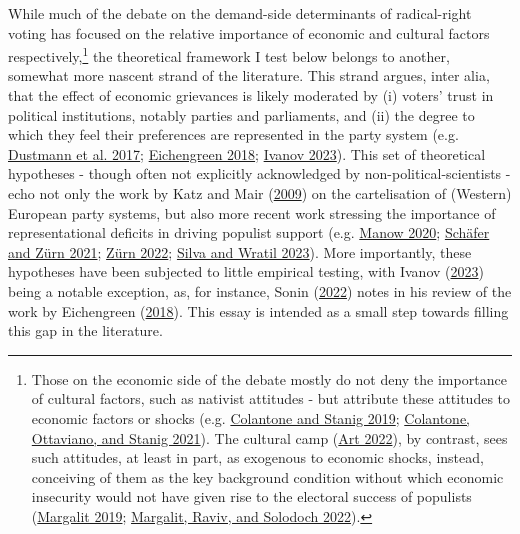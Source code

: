 \documentclass[
]{article}
\begin{document}
While much of the debate on the demand-side determinants of
radical-right voting has focused on the relative importance of economic
and cultural factors respectively,\footnote{Those on the economic side
  of the debate mostly do not deny the importance of cultural factors,
  such as nativist attitudes - but attribute these attitudes to economic
  factors or shocks (e.g.
  \protect\hyperlink{ref-colantone_surge_2019}{Colantone and Stanig
  2019}; \protect\hyperlink{ref-colantone_backlash_2021}{Colantone,
  Ottaviano, and Stanig 2021}). The cultural camp
  (\protect\hyperlink{ref-art_myth_2022}{Art 2022}), by contrast, sees
  such attitudes, at least in part, as exogenous to economic shocks,
  instead, conceiving of them as the key background condition without
  which economic insecurity would not have given rise to the electoral
  success of populists
  (\protect\hyperlink{ref-margalit_economic_2019}{Margalit 2019};
  \protect\hyperlink{ref-margalit_cultural_2022}{Margalit, Raviv, and
  Solodoch 2022}).} the theoretical framework I test below belongs to
another, somewhat more nascent strand of the literature. This strand
argues, inter alia, that the effect of economic grievances is likely
moderated by (i) voters' trust in political institutions, notably
parties and parliaments, and (ii) the degree to which they feel their
preferences are represented in the party system (e.g.
\protect\hyperlink{ref-dustmann_europes_2017}{Dustmann et al. 2017};
\protect\hyperlink{ref-eichengreen_populist_2018}{Eichengreen 2018};
\protect\hyperlink{ref-ivanov_economic_2023}{Ivanov 2023}). This set of
theoretical hypotheses - though often not explicitly acknowledged by
non-political-scientists - echo not only the work by Katz and Mair
(\protect\hyperlink{ref-katz_cartel_2009}{2009}) on the cartelisation of
(Western) European party systems, but also more recent work stressing
the importance of representational deficits in driving populist support
(e.g. \protect\hyperlink{ref-manow_ent-demokratisierung_2020}{Manow
2020}; \protect\hyperlink{ref-schafer_demokratische_2021}{Schäfer and
Zürn 2021}; \protect\hyperlink{ref-zurn_how_2022}{Zürn 2022};
\protect\hyperlink{ref-silva_parties_2023}{Silva and Wratil 2023}). More
importantly, these hypotheses have been subjected to little empirical
testing, with Ivanov
(\protect\hyperlink{ref-ivanov_economic_2023}{2023}) being a notable
exception, as, for instance, Sonin
(\protect\hyperlink{ref-sonin_historical_2022}{2022}) notes in his
review of the work by Eichengreen
(\protect\hyperlink{ref-eichengreen_populist_2018}{2018}). This essay is
intended as a small step towards filling this gap in the literature.
\end{document}

